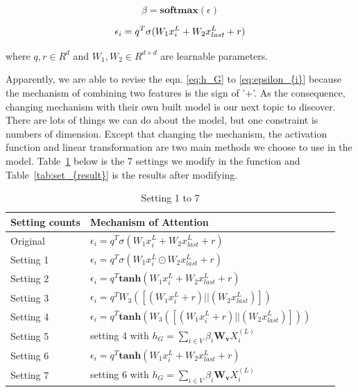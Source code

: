 \documentclass{article}
\begin{document}
\begin{equation}
    \label{eq:beta}
    \beta = \textbf{softmax}(\epsilon)
\end{equation}

\begin{equation}
    \label{eq:epsilon_{i}}
    \epsilon_{i} = q^{T}\sigma(W_1x_i^{L} + W_2x_{last}^{L} + r)
\end{equation}

where $q,r \in R^d$ and $W_1,W_2 \in R^{d \times d}$ are learnable parameters.

Apparently, we are able to revise the eqn.
\ref{eq:h_G} to \ref{eq:epsilon_{i}} because
the mechanism of combining two features is the sign of '+'.
As the consequence, changing mechanism with their own built model
is our next topic to discover.
There are lots of things we can do about the model,
but one constraint is numbers of dimension.
Except that changing the mechanism,
the activation function and linear transformation are
two main methods we choose to use in the model.
Table~\ref{tab:setting} below is the 7 settings we modify
in the function and Table~\ref{tab:set_{result}}
is the results after modifying.

\begin{table}
    \caption{Setting 1 to 7}
    \label{tab:setting}
    \centering
    \begin{tabular}{llll}
        \toprule
        Setting counts & Mechanism of Attention                                                          \\
        \midrule
        Original       & $\epsilon_{i} = q^{T}\sigma(W_1x_i^{L} + W_2x_{last}^{L} + r)$                  \\
        Setting 1      & $\epsilon_{i} = q^{T}\sigma(W_1x_i^{L} \odot W_2x_{last}^{L} + r)$              \\
        Setting 2      & $\epsilon_{i} = q^{T}\textbf{tanh}(W_1x_i^{L} + W_2x_{last}^{L} + r)$           \\
        Setting 3      & $\epsilon_{i} = q^{T}W_3([(W_1x_i^{L} + r)||(W_2x_{last}^{L})])$                \\
        Setting 4      & $\epsilon_{i} = q^{T}\textbf{tanh}(W_3([(W_1x_i^{L} + r)||(W_2x_{last}^{L})]))$ \\
        Setting 5      & setting 4 with $h_G = \sum_{i \in V}\beta_{i}\bm{W_{v}}X_{i}^{(L)}$             \\
        Setting 6      & $\epsilon_{i} = q^{T}\textbf{tanh}(W_1x_i^{L} + W_2x_{last}^{L} + r)$           \\
        Setting 7      & setting 6 with $h_G = \sum_{i \in V}\beta_{i}\bm{W_{v}}X_{i}^{(L)}$             \\
        \bottomrule
    \end{tabular}
\end{table}
\end{document}
